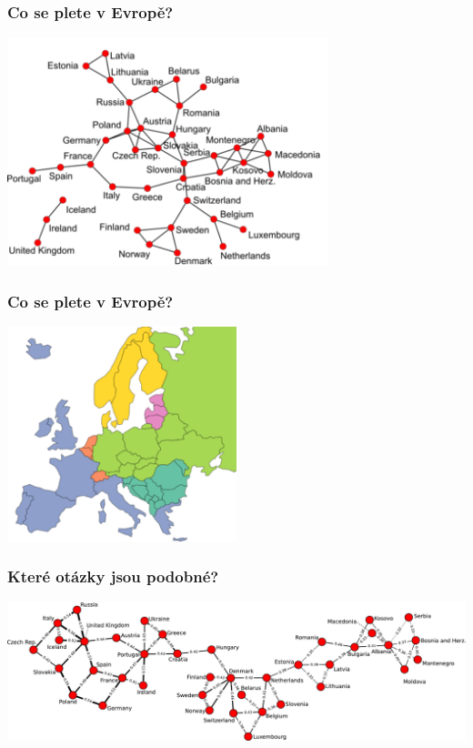 \documentclass[xcolor=svgnames]{beamer}
\begin{document}
\begin{frame}
	\frametitle{Co se plete v Evropě?}
	\begin{center}
		\includegraphics[width=0.7\textwidth]{img/europe-graph-clusters.png}
	\end{center}
\end{frame}
\begin{frame}
	\frametitle{Co se plete v Evropě?}
	\begin{center}
		\includegraphics[width=0.5\textwidth]{img/europe-graph-clusters2.png}
	\end{center}
\end{frame}
\begin{frame}
	\frametitle{Které otázky jsou podobné?}
	\begin{center}
		\includegraphics[width=\textwidth]{img/europe-graph}
	\end{center}
\end{frame}
\end{document}
